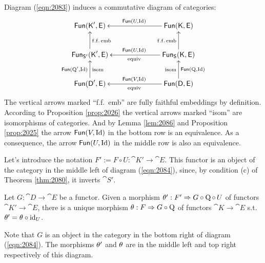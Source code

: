 Diagram (\ref{eqn:2083}) induces a commutative diagram of categories:
\begin{equation} \label{eqn:2084}
\UseTips \xymatrix @C=16ex @R=5.5ex {
\cat{Fun}(\cat{K}', \cat{E})
&
\cat{Fun}(\cat{K}, \cat{E})
\ar[l]_{\cat{Fun}(U, \opn{Id})}
\\
\cat{Fun}_{\cat{S}'}(\cat{K}', \cat{E})
\ar[u]_{\mrm{f.f. \, emb}}
&
\cat{Fun}_{\cat{S}}(\cat{K}, \cat{E})
\ar[u]^{\mrm{f.f. \, emb}}
\ar[l]^{\mrm{equiv}}_{\cat{Fun}(U, \opn{Id})}
\\
\cat{Fun}(\cat{D}', \cat{E})
\ar[u]^{\cat{Fun}(\opn{Q}', \opn{Id})}_{\mrm{isom}}
&
\cat{Fun}(\cat{D}, \cat{E})
\ar[l]_{\cat{Fun}(V, \opn{Id})}^{\mrm{equiv}}
\ar[u]_{\cat{Fun}(\opn{Q}, \opn{Id})}^{\mrm{isom}}
} 
\end{equation}
The vertical arrows marked ``f.f.\ emb'' are fully faithful embeddings by 
definition. According to Proposition \ref{prop:2026}  the vertical arrows 
marked ``isom'' are isomorphisms of categories. And by Lemma \ref{lem:2086} and 
Proposition \ref{prop:2025} the arrow $\operatorname{\mathsf{Fun}}(V, \operatorname{Id})$  in the bottom 
row is an equivalence. As a consequence, the arrow $\operatorname{\mathsf{Fun}}(U, \operatorname{Id})$ in 
the middle row is also an equivalence.

Let's introduce the notation 
$F' := F \circ U : \cat{K}' \to \cat{E}$.
This functor is an object of the category in the middle left of diagram 
(\ref{eqn:2084}), since, by condition (c) of Theorem \ref{thm:2080}, it inverts 
$\cat{S}'$.  

\begin{lem} \label{lem:3390}
Let $G : \cat{D} \to \cat{E}$ be a functor. Given a morphism 
$\theta' : F' \Rightarrow G \circ \operatorname{Q} \circ \, U$
of functors $\cat{K}' \to \cat{E}$, there is a unique morphism 
$\theta : F \Rightarrow G \circ \operatorname{Q}$
of functors $\cat{K} \to \cat{E}$ s.t.\ 
$\theta' = \theta \circ \operatorname{id}_{U}$. 
\end{lem}

Note that $G$ is an object in the category in the bottom right of diagram 
(\ref{eqn:2084}). The morphisms $\theta'$ and $\theta$ are in the middle left and top 
right respectively of this diagram. 

